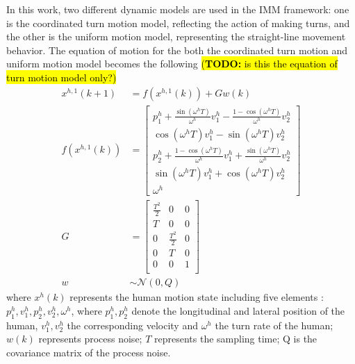 \documentclass[letterpaper, 10 pt, conference]{ieeeconf}
\newcommand{\todohere}[1]{\hl{(\textbf{TODO:} #1)}}
\begin{document}
	In this work, two different dynamic models are used in the IMM framework: one is the coordinated turn motion model, reflecting the action of making turns, and the other is the uniform motion model, representing the straight-line movement behavior. 
	The equation of motion for the both the coordinated turn motion and uniform motion model becomes the following \todohere{is this the equation of turn motion model only?}
	\begin{subequations}
		\begin{align}
		x^{h,1}(k+1)&= f(x^{h,1}(k))+Gw(k)\\
		f(x^{h,1}(k))&=\left[
		\begin{array}{c}
		p^h_1+\frac{\sin(\omega^h T)}{\omega^h}v^h_1-\frac{1-\cos(\omega^h T)}{\omega^h}v^h_2\\
		\cos(\omega^h T)v^h_1-\sin(\omega^h T)v^h_2\\
		p^h_2+\frac{1-\cos(\omega^h T)}{\omega^h}v^h_1+\frac{\sin(\omega^h T)}{\omega^h}v^h_2\\
		\sin(\omega^h T)v^h_1+\cos(\omega^h T)v^h_2\\
		\omega^h 
		\end{array}\right]\\
		G &= \left[
		\begin{array}{ccc}
		\frac{T^2}{2}& 0& 0\\
		T& 0& 0\\
		0& \frac{T^2}{2}& 0\\
		0& T& 0\\
		0& 0& 1\\
		\end{array}\right]\\
		w&\sim\mathcal{N}(0,Q)
		\end{align}
	\end{subequations}
	where $x^h(k)$ represents the human motion state including five elements : $p^h_1,v^h_1,p^h_2,v^h_2,\omega^h$, where $p^h_1,p^h_2$ denote the longitudinal and lateral position of the human, $v^h_1,v^h_2$ the corresponding velocity and $\omega^h$ the turn rate of the human; $w(k)$ represents process noise; $T$ represents the sampling time; Q is the covariance matrix of the process noise.
	
\end{document}
